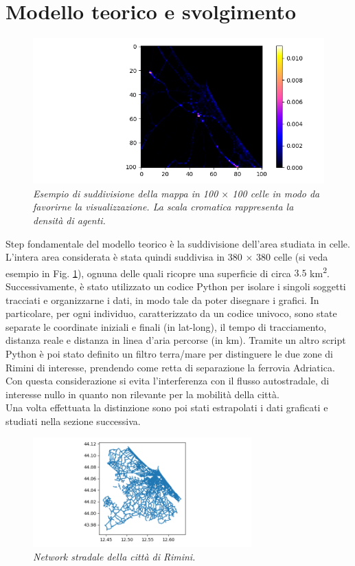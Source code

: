 \documentclass[12pt,a4paper]{article}
\begin{document}
\section{Modello teorico e svolgimento}
\begin{figure}
\centering
\includegraphics[width=\textwidth]{init.png}
\caption{\emph{Esempio di suddivisione della mappa in 100 $\times$ 100 celle in modo da favorirne la visualizzazione. La scala cromatica rappresenta la densità di agenti.}}
\label{figure:cells}
\end{figure}
Step fondamentale del modello teorico è la suddivisione dell'area studiata in celle.
L'intera area considerata è stata quindi suddivisa in 380 $\times$ 380 celle (si veda esempio in Fig. \ref{figure:cells}), ognuna delle quali ricopre una superficie di circa $3.5$ km\textsuperscript{2}.
Successivamente, è stato utilizzato un codice Python per isolare i singoli soggetti tracciati e organizzarne i dati, in modo tale da poter disegnare i grafici.
In particolare, per ogni individuo, caratterizzato da un codice univoco, sono state separate le coordinate iniziali e finali (in lat-long), il tempo di tracciamento, distanza reale e distanza in linea d'aria percorse (in km).
Tramite un altro script Python è poi stato definito un filtro terra/mare per distinguere le due zone di Rimini di interesse, prendendo come retta di separazione la ferrovia Adriatica.
Con questa considerazione si evita l'interferenza con il flusso autostradale, di interesse nullo in quanto non rilevante per la mobilità della città.\\
Una volta effettuata la distinzione sono poi stati estrapolati i dati graficati e studiati nella sezione successiva.
\begin{figure}[h!]
\centering
\includegraphics[width=0.75\textwidth]{city.png}
\caption{\emph{Network stradale della città di Rimini.}}
\label{figure:rimini}
\end{figure}
\end{document}
